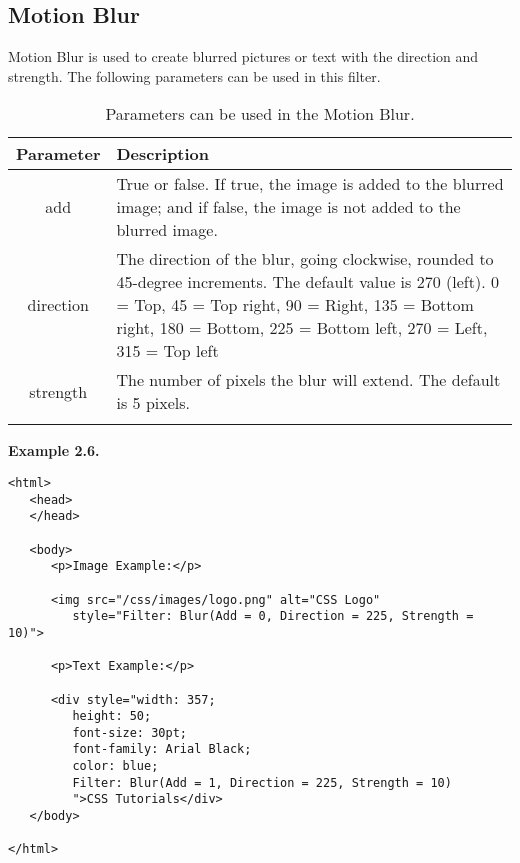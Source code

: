 \documentclass[a4paper,oneside]{book}
\numberwithin{equation}{chapter}
\begin{document}
\subsection{Motion Blur}
Motion Blur is used to create blurred pictures or text with the direction and strength. The following parameters can be used in this filter.
\begin{center}
\begin{longtable}{|c|p{9cm}|}
\hline
\textbf{Parameter} & \textbf{Description}\\
\hline
add & True or false. If true, the image is added to the blurred image; and if false, the image is not added to the blurred image.\\
\hline
direction & The direction of the blur, going clockwise, rounded to 45-degree increments. The default value is 270 (left). 0 = Top, 45 = Top right, 90 = Right, 135 = Bottom right, 180 = Bottom, 225 = Bottom left, 270 = Left, 315 = Top left\\
\hline
strength & The number of pixels the blur will extend. The default is 5 pixels.\\
\hline
\caption{Parameters can be used in the Motion Blur.}
\end{longtable}
\end{center}
\textbf{Example 2.6.} 
\begin{verbatim}
<html>
   <head>
   </head>
   
   <body>
      <p>Image Example:</p>
      
      <img src="/css/images/logo.png" alt="CSS Logo" 
         style="Filter: Blur(Add = 0, Direction = 225, Strength = 10)">
      
      <p>Text Example:</p>
      
      <div style="width: 357; 
         height: 50; 
         font-size: 30pt; 
         font-family: Arial Black; 
         color: blue; 
         Filter: Blur(Add = 1, Direction = 225, Strength = 10)
         ">CSS Tutorials</div>
   </body>
   
</html> 
\end{verbatim}
\end{document}
